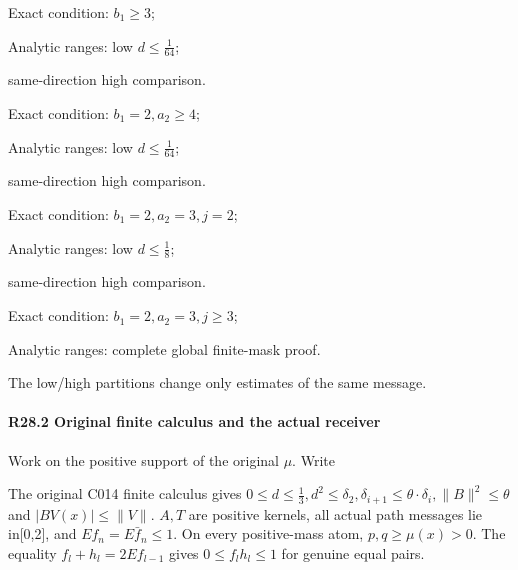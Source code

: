 \begin{description}[style=nextline,leftmargin=1.6em,before=\raggedright]
\item[{I}] Exact condition: \(b_{1}\ge 3\);\par\noindent Analytic ranges: low \(d\le \frac{1}{64}\);\par\noindent same-direction high comparison.
\item[{II}] Exact condition: \(b_{1}=2,\allowbreak \allowbreak a_{2}\ge 4\);\par\noindent Analytic ranges: low \(d\le \frac{1}{64}\);\par\noindent same-direction high comparison.
\item[{IIIa}] Exact condition: \(b_{1}=2,\allowbreak \allowbreak a_{2}=3,\allowbreak \allowbreak j=2\);\par\noindent Analytic ranges: low \(d\le \frac{1}{8}\);\par\noindent same-direction high comparison.
\item[{IIIb}] Exact condition: \(b_{1}=2,\allowbreak \allowbreak a_{2}=3,\allowbreak \allowbreak j\ge 3\);\par\noindent Analytic ranges: complete global finite-mask proof.
\end{description}

The low/high partitions change only estimates of the same message.

\paragraph{R28.2 Original finite calculus and the actual receiver}

Work on the positive support of the original \(\mu\). Write


The original C014 finite calculus gives \(0\le d\le \frac{1}{3},\allowbreak \allowbreak  d^2\le \delta_2,\allowbreak \allowbreak  \delta_{i+1}\le \theta\cdot \delta_i,\allowbreak \allowbreak  \lVert B\rVert ^2\le \theta\) and \(\lvert BV(x)\rvert \le \lVert V\rVert \). \(A,\allowbreak \allowbreak T\) are positive kernels, all actual path messages lie in[0,2], and \(E f_n=E \bar f_n\le 1\). On every positive-mass atom, \(p,\allowbreak \allowbreak q\ge \mu(x)>0\). The equality \(f_l+h_l=2E f_{l-1}\) gives \(0\le f_l h_l\le 1\) for genuine equal pairs.


